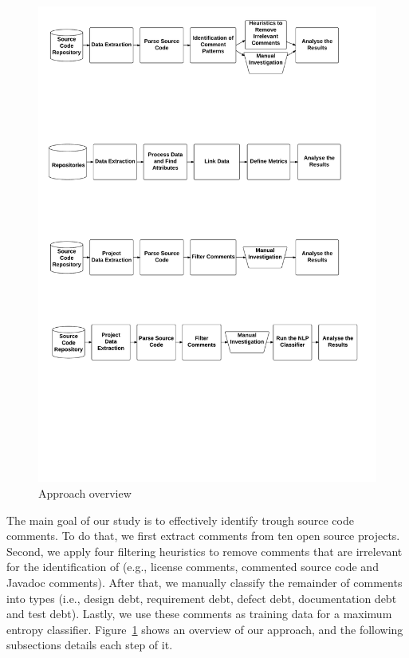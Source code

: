 \begin{figure}[thb!]
  \centering
  \includegraphics[width=1\textwidth]{figures/approach.pdf}
  \caption{Approach overview}
  \label{fig:approach}
\end{figure}

The main goal of our study is to effectively identify \SATD trough source code comments. To do that, we first extract comments from ten open source projects. Second, we apply four filtering heuristics to remove comments that are irrelevant for the identification of \SATD  (e.g., license comments, commented source code and Javadoc comments). After that, we manually classify the remainder of comments into \SATD types (i.e., design debt, requirement debt, defect debt, documentation debt and test debt). Lastly, we use these comments as training data for a maximum entropy classifier. Figure~\ref{fig:approach} shows an overview of our approach, and the following subsections details each step of it.


